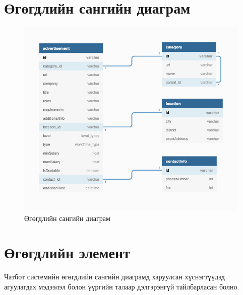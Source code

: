 \section{Өгөгдлийн сангийн диаграм}
\begin{figure}[ht]
  \centering
  \includegraphics[width = \textwidth]{images/dbDiagram.png}
  \caption{Өгөгдлийн сангийн диаграм}\label{fig:dbDiagram}
\end{figure}
\newpage

\section{Өгөгдлийн элемент}
Чатбот системийн өгөгдлийн сангийн диаграмд харуулсан хүснэгтүүдэд агуулагдах мэдээлэл болон үүргийн талаар дэлгэрэнгүй тайлбарласан болно. 
